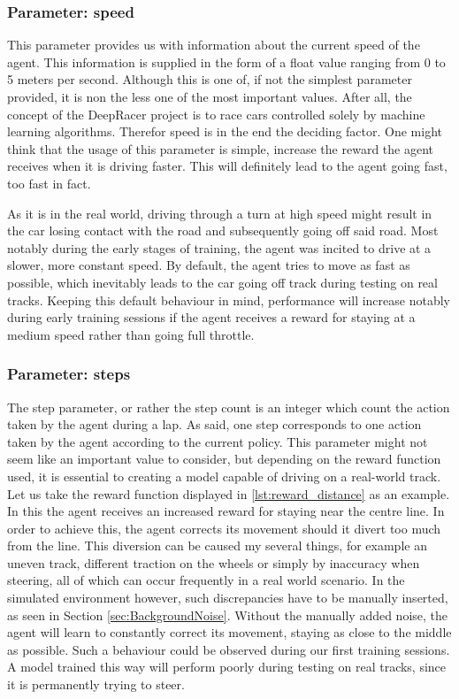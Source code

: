 \subsubsection{Parameter: speed}
This parameter provides us with information about the current speed of the agent. This information is supplied in the form of a float value ranging from 0 to 5 meters per second. Although this is one of, if not the simplest parameter provided, it is non the less one of the most important values. After all, the concept of the DeepRacer project is to race cars controlled solely by machine learning algorithms. Therefor speed is in the end the deciding factor. One might think that the usage of this parameter is simple, increase the reward the agent receives when it is driving faster. This will definitely lead to the agent going fast, too fast in fact. 

As it is in the real world, driving through a turn at high speed might result in the car losing contact with the road and subsequently going off said road. Most notably during the early stages of training, the agent was incited to drive at a slower, more constant speed. By default, the agent tries to move as fast as possible, which inevitably leads to the car going off track during testing on real tracks. Keeping this default behaviour in mind, performance will increase notably during early training sessions if the agent receives a reward for staying at a medium speed rather than going full throttle.

%
%

\subsubsection{Parameter: steps}
The step parameter, or rather the step count is an integer which count the action taken by the agent during a lap. As said, one step corresponds to one action taken by the agent according to the current policy. This parameter might not seem like an important value to consider, but depending on the reward function used, it is essential to creating a model capable of driving on a real-world track.
Let us take the reward function displayed in \ref{lst:reward_distance} as an example. In this the agent receives an increased reward for staying near the centre line. In order to achieve this, the agent corrects its movement should it divert too much from the line. This diversion can be caused my several things, for example an uneven track, different traction on the wheels or simply by inaccuracy when steering, all of which can occur frequently in a real world scenario. In the simulated environment however, such discrepancies have to be manually inserted, as seen in Section \ref{sec:BackgroundNoise}. Without the manually added noise, the agent will learn to constantly correct its movement, staying as close to the middle as possible. Such a behaviour could be observed during our first training sessions. A model trained this way will perform poorly during testing on real tracks, since it is permanently trying to steer.

